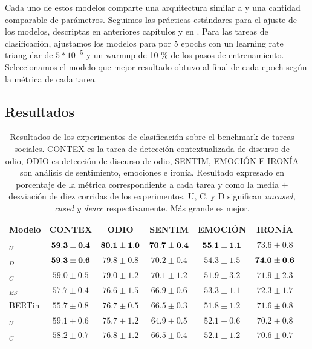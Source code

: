 Cada uno de estos modelos comparte una arquitectura similar a \robertuito{} y una cantidad comparable de parámetros. Seguimos las prácticas estándares para el ajuste de los modelos, descriptas en anteriores capítulos y en \citet{devlin2018bert}. Para las tareas de clasificación, ajustamos los modelos para por 5 epochs con un learning rate triangular de $5 * 10^{-5}$ y un warmup de 10 \% de los pasos de entrenamiento. Seleccionamos el modelo que mejor resultado obtuvo al final de cada epoch según la métrica de cada tarea.

\subsection{Resultados}


\begin{table}
    \centering
    \begin{tabular}{l ccccc }
        Modelo                & CONTEX             &  ODIO                 &  SENTIM        &  EMOCIÓN             &  IRONÍA               \\
        \hline
        \robertuito{}$_U$     & $\mathbf{59.3 \pm 0.4}$ &  $\mathbf{80.1 \pm 1.0}$ & $\mathbf{70.7 \pm 0.4}$ & $\mathbf{55.1 \pm 1.1}$ & $73.6 \pm 0.8$  \\
        \robertuito{}$_D$     & $\mathbf{59.3 \pm 0.6}$ &  $79.8 \pm 0.8$       & $70.2 \pm 0.4$       & $54.3 \pm 1.5$       & $\mathbf{74.0 \pm 0.6}$  \\
        \robertuito{}$_C$     & $59.0 \pm 0.5$       &  $79.0 \pm 1.2$       & $70.1 \pm 1.2$       & $51.9 \pm 3.2$       & $71.9 \pm 2.3$  \\
        \roberta{}$_{ES}$     & $57.7 \pm 0.4$       &  $76.6 \pm 1.5$       & $66.9 \pm 0.6$       & $53.3 \pm 1.1$       & $72.3 \pm 1.7$  \\
        BERTin                & $55.7 \pm 0.8$       &  $76.7 \pm 0.5$       & $66.5 \pm 0.3$       & $51.8 \pm 1.2$       & $71.6 \pm 0.8$  \\
        \beto{}$_U$              & $59.1 \pm 0.6$       &  $75.7 \pm 1.2$       & $64.9 \pm 0.5$       & $52.1 \pm 0.6$       & $70.2 \pm 0.8$  \\
        \beto{}$_C$              & $58.2 \pm 0.7$       &  $76.8 \pm 1.2$       & $66.5 \pm 0.4$       & $52.1 \pm 1.2$       & $70.6 \pm 0.7$  \\
        \hline
    \end{tabular}
    \caption{Resultados de los experimentos de clasificación sobre el benchmark de tareas sociales. CONTEX es la tarea de detección contextualizada de discurso de odio, ODIO es detección de discurso de odio, SENTIM, EMOCIÓN E IRONÍA son análisis de sentimiento, emociones e ironía. Resultado expresado en porcentaje de la métrica correspondiente a cada tarea y como la media $\pm$ desviación de diez corridas de los experimentos. U, C, y D significan \emph{uncased, cased y deacc} respectivamente. Más grande es mejor.}
    \label{tab:robertuito_evaluation_results}
\end{table}


